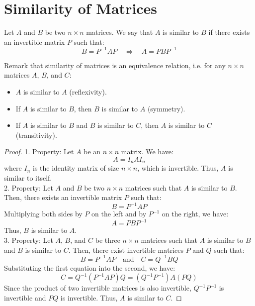 \section{Similarity of Matrices}
\begin{definition}
    Let $A$ and $B$ be two $n \times n$ matrices. We say that $A$ is similar to $B$ if there exists an invertible matrix $P$ such that:
    \[B = P^{-1} A P \quad \iff \quad A = P B P^{-1}\]
\end{definition}
Remark that similarity of matrices is an equivalence relation, i.e. for any $n \times n$ matrices $A$, $B$, and $C$:
\begin{itemize}[itemsep=1pt,label=$\circ$]
    \item $A$ is similar to $A$ (reflexivity).
    \item If $A$ is similar to $B$, then $B$ is similar to $A$ (symmetry).
    \item If $A$ is similar to $B$ and $B$ is similar to $C$, then $A$ is similar to $C$ (transitivity).
\end{itemize}
\begin{proof}
    1. Property: Let $A$ be an $n \times n$ matrix. We have:
    \[A = I_n A I_n\]
    where $I_n$ is the identity matrix of size $n \times n$, which is invertible. Thus, $A$ is similar to itself. \\
    2. Property: Let $A$ and $B$ be two $n \times n$ matrices such that $A$ is similar to $B$. Then, there exists an invertible matrix $P$ such that:
    \[B = P^{-1} A P\]
    Multiplying both sides by $P$ on the left and by $P^{-1}$ on the right, we have:
    \[A = P B P^{-1}\]
    Thus, $B$ is similar to $A$. \\
    3. Property: Let $A$, $B$, and $C$ be three $n \times n$ matrices such that $A$ is similar to $B$ and $B$ is similar to $C$. Then, there exist invertible matrices $P$ and $Q$ such that:
    \[B = P^{-1} A P \quad \text{and} \quad C = Q^{-1} B Q\]
    Substituting the first equation into the second, we have:
    \[C = Q^{-1} (P^{-1} A P) Q = (Q^{-1} P^{-1}) A (P Q)\]
    Since the product of two invertible matrices is also invertible, $Q^{-1} P^{-1}$ is invertible and $P Q$ is invertible. Thus, $A$ is similar to $C$.
\end{proof}

